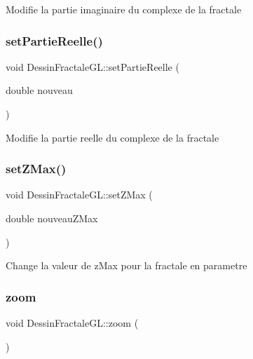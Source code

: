 Modifie la partie imaginaire du complexe de la fractale \mbox{\label{classDessinFractaleGL_a0e06c9c77de183536183c4794713b0ea}} 
\subsubsection{\texorpdfstring{set\+Partie\+Reelle()}{setPartieReelle()}}
{\footnotesize\ttfamily void Dessin\+Fractale\+G\+L\+::set\+Partie\+Reelle (\begin{DoxyParamCaption}\item[{double}]{nouveau }\end{DoxyParamCaption})}

Modifie la partie reelle du complexe de la fractale \mbox{\label{classDessinFractaleGL_a6b797eb0823a66b19cdf9d62bad58a3d}} 
\subsubsection{\texorpdfstring{set\+Z\+Max()}{setZMax()}}
{\footnotesize\ttfamily void Dessin\+Fractale\+G\+L\+::set\+Z\+Max (\begin{DoxyParamCaption}\item[{double}]{nouveau\+Z\+Max }\end{DoxyParamCaption})}

Change la valeur de z\+Max pour la fractale en parametre \mbox{\label{classDessinFractaleGL_a2ca7a7e0c01a8b1e5b6587b5d087bc8d}} 
\subsubsection{\texorpdfstring{zoom}{zoom}}
{\footnotesize\ttfamily void Dessin\+Fractale\+G\+L\+::zoom (\begin{DoxyParamCaption}{ }\end{DoxyParamCaption})\hspace{0.3cm}{\ttfamily [slot]}}

